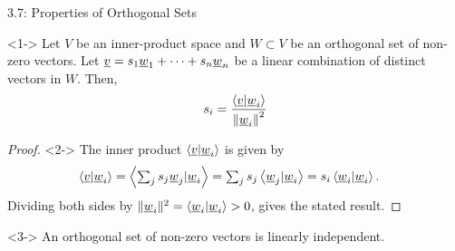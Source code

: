 \documentclass[10pt,letterpaper,english]{beamer}
\begin{document}
\begin{frame}{3.7: Properties of Orthogonal Sets}

\begin{lemma}<1->
Let $V$ be an inner-product space and $W\subset V$ be an orthogonal set of non-zero vectors.
Let $\underline{v} = s_1 \underline{w}_1 + \cdots + s_n \underline{w}_n$ be a linear combination of distinct vectors in $W$.
Then, \vspace{-2mm}
\[ s_i = \frac{ \left\langle \underline{v} | \underline{w}_i \right\rangle }
{ \left\| \underline{w}_i \right\|^2 }\]
\end{lemma}

\begin{proof}<2->
The inner product $\left\langle \underline{v} | \underline{w}_i \right\rangle$ is given by \vspace{-1mm}
\begin{equation*}
\begin{split}
\left\langle \vecnot{v} | \vecnot{w}_i \right\rangle
&= \left\langle \textstyle\sum_j s_j \vecnot{w}_j | \vecnot{w}_i \right\rangle
= \textstyle\sum_j s_j \left\langle \vecnot{w}_j | \vecnot{w}_i \right\rangle
= s_i \left\langle \vecnot{w}_i | \vecnot{w}_i \right\rangle .
\end{split} \vspace{-1mm}
\end{equation*}
Dividing both sides by $\| \underline{w}_i \|^2 = \left\langle \underline{w}_i | \underline{w}_i \right\rangle > 0$, gives the stated result.
\end{proof}

\begin{theorem}<3->
An orthogonal set of non-zero vectors is linearly independent.
\end{theorem}


\end{frame}
\end{document}
